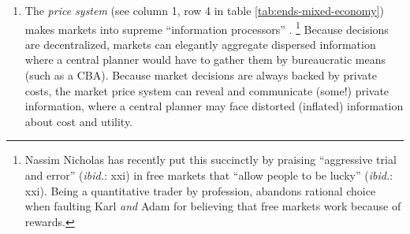 \begin{enumerate}
	\item The \emph{price system} (see column 1, row 4 in table \ref{tab:ends-mixed-economy}) makes markets into supreme ``information processors'' \citep{Hayek1931}.
	\footnote{
		Nassim Nicholas \cite{Taleb2007} has recently put this succinctly by praising ``aggressive trial and error'' (\emph{ibid.}: xxi) in free markets that ``allow people to be lucky'' (\emph{ibid.}: xxi).
		Being a quantitative trader by profession, \cite{Taleb2007} abandons rational choice when faulting Karl \cite{Marx-1867-aa} \emph{and} Adam \cite{Smith-1776-lq} for believing that free markets work because of rewards.
	}
	Because decisions are decentralized, markets can elegantly aggregate dispersed information where a central planner would have to gather them by bureaucratic means (such as a \gls{CBA}).
	Because market decisions are always backed by private costs, the market price system can reveal and communicate (some!) private information, where a central planner may face distorted (inflated) information about cost and utility.
\end{enumerate}

